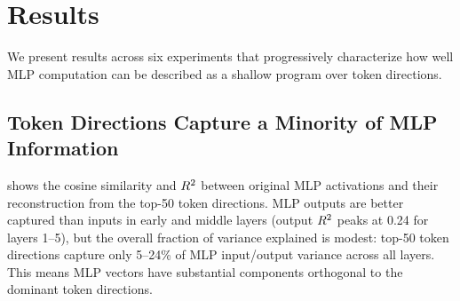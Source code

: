 \section{Results}
\label{sec:results}

We present results across six experiments that progressively characterize how well MLP computation can be described as a shallow program over token directions.

\subsection{Token Directions Capture a Minority of MLP Information}
\label{sec:res_decomp}

 shows the cosine similarity and $\Rsq$ between original MLP activations and their reconstruction from the top-50 token directions.
MLP outputs are better captured than inputs in early and middle layers (output $\Rsq$ peaks at 0.24 for layers 1--5), but the overall fraction of variance explained is modest: top-50 token directions capture only 5--24\% of MLP input/output variance across all layers.
This means MLP vectors have substantial components orthogonal to the dominant token directions.

\begin{table}[t]
    \centering
    \caption{Token direction decomposition. Cosine similarity and $\Rsq$ between MLP activations and their reconstruction from the top-50 token directions (via $\Wu$), averaged over 1,000 sampled positions per layer. Token directions capture only a minority of MLP variance.}
    \label{tab:decomposition}
\end{table}

